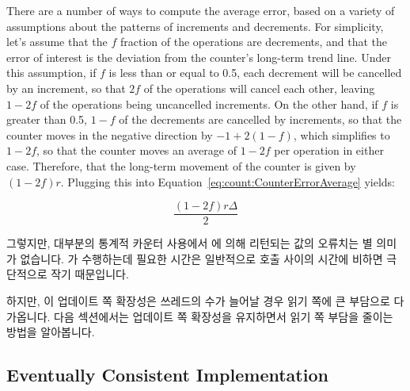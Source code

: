 {	There are a number of ways to compute the average error,
	based on a variety of assumptions about the patterns of
	increments and decrements.
	For simplicity, let's assume that the $f$ fraction of
	the operations are decrements, and that the error of interest
	is the deviation from the counter's long-term trend line.
	Under this assumption, if $f$ is less than or equal to 0.5,
	each decrement will be cancelled by an increment, so that
	$2f$ of the operations will cancel each other, leaving
	$1-2f$ of the operations being uncancelled increments.
	On the other hand, if $f$ is greater than 0.5, $1-f$ of
	the decrements are cancelled by increments, so that the
	counter moves in the negative direction by $-1+2\left(1-f\right)$,
	which simplifies to $1-2f$, so that the counter moves an average
	of $1-2f$ per operation in either case.
	Therefore, that the long-term
	movement of the counter is given by $\left( 1-2f \right) r$.
	Plugging this into
	Equation~\ref{eq:count:CounterErrorAverage} yields:
	\fi

	\begin{equation}
		\frac{\left( 1 - 2 f \right) r \Delta}{2}
	\end{equation}

	그렇지만, 대부분의 통계적 카운터 사용에서  에 의해
	리턴되는 값의 오류치는 별 의미가 없습니다.
	 가 수행하는데 필요한 시간은 일반적으로
	 호출 사이의 시간에 비하면 극단적으로 작기 때문입니다.

} \QuickQuizEnd

하지만, 이 업데이트 쪽 확장성은 쓰레드의 수가 늘어날 경우 읽기 쪽에 큰 부담으로
다가옵니다.
다음 섹션에서는 업데이트 쪽 확장성을 유지하면서 읽기 쪽 부담을 줄이는 방법을
알아봅니다.

\subsection{Eventually Consistent Implementation}
\label{sec:count:Eventually Consistent Implementation}

